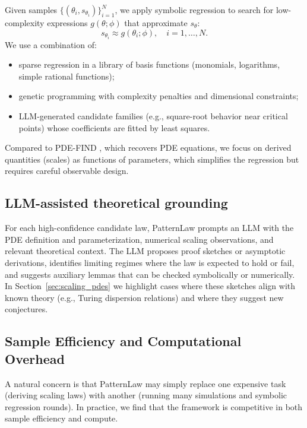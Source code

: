 \documentclass{article}
\theoremstyle{plain}
\theoremstyle{definition}
\theoremstyle{remark}
\begin{document}
Given samples $\{(\theta_i,s_{\theta_i})\}_{i=1}^N$, we apply symbolic regression to search for low-complexity expressions $g(\theta;\phi)$ that approximate $s_\theta$:
\begin{equation}
    s_{\theta_i} \approx g(\theta_i;\phi), \quad i=1,\dots,N.
\end{equation}
We use a combination of:
\begin{itemize}
    \item sparse regression in a library of basis functions (monomials, logarithms, simple rational functions);
    \item genetic programming with complexity penalties and dimensional constraints;
    \item LLM-generated candidate families (e.g., square-root behavior near critical points) whose coefficients are fitted by least squares.
\end{itemize}
Compared to PDE-FIND \citep{Rudy2017PDEDiscovery}, which recovers PDE equations, we focus on derived quantities (scales) as functions of parameters, which simplifies the regression but requires careful observable design.

\subsection{LLM-assisted theoretical grounding}

For each high-confidence candidate law, PatternLaw prompts an LLM with the PDE definition and parameterization, numerical scaling observations, and relevant theoretical context. The LLM proposes proof sketches or asymptotic derivations, identifies limiting regimes where the law is expected to hold or fail, and suggests auxiliary lemmas that can be checked symbolically or numerically. In Section~\ref{sec:scaling_pdes} we highlight cases where these sketches align with known theory (e.g., Turing dispersion relations) and where they suggest new conjectures.

\subsection{Sample Efficiency and Computational Overhead}

A natural concern is that PatternLaw may simply replace one expensive task (deriving scaling laws) with another (running many simulations and symbolic regression rounds). In practice, we find that the framework is competitive in both sample efficiency and compute.
\end{document}

